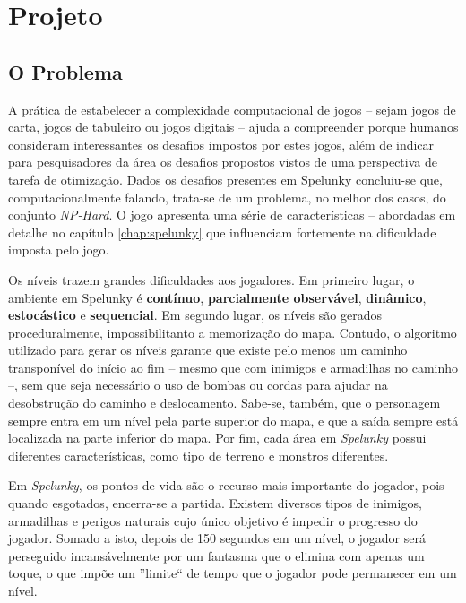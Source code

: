 \chapter{\label{chap:project}Projeto}


\section{\label{section:problem}O Problema}
A prática de estabelecer a complexidade computacional de jogos -- sejam jogos de
carta, jogos de tabuleiro ou jogos digitais -- ajuda a compreender  porque
humanos consideram interessantes os desafios impostos por estes jogos, além de
indicar para pesquisadores da área os desafios propostos vistos de uma
perspectiva de tarefa de otimização.  Dados os desafios presentes em Spelunky
concluiu-se que, computacionalmente falando, trata-se de um problema, no melhor
dos casos, do conjunto \textit{NP-Hard}\cite{SPELUNKYHARD}. O jogo apresenta uma
série de características -- abordadas em detalhe no capítulo \ref{chap:spelunky}
que influenciam fortemente na dificuldade imposta pelo jogo.

Os níveis trazem grandes dificuldades aos jogadores. Em primeiro lugar, o
ambiente em Spelunky é \textbf{contínuo}, \textbf{parcialmente observável},
\textbf{dinâmico}, \textbf{estocástico} e \textbf{sequencial}. Em segundo
lugar, os níveis são gerados proceduralmente, impossibilitanto a memorização do
mapa.  Contudo, o algoritmo utilizado para gerar os níveis garante que existe
pelo menos um caminho transponível do início ao fim -- mesmo que com inimigos e
armadilhas no caminho --, sem que seja necessário o uso de bombas ou cordas
para ajudar na desobstrução do caminho e deslocamento. Sabe-se, também, que o
personagem sempre entra em um nível pela parte superior do mapa, e que a saída
sempre está localizada na parte inferior do mapa. Por fim, cada área em
\textit{Spelunky} possui diferentes características, como tipo de terreno e
monstros diferentes.

Em \textit{Spelunky}, os pontos de vida são o recurso mais importante do
jogador, pois quando esgotados, encerra-se a partida. Existem diversos tipos de
inimigos, armadilhas e perigos naturais cujo único objetivo é impedir o
progresso do jogador.  Somado a isto, depois de 150 segundos em um nível, o
jogador será perseguido incansávelmente por um fantasma que o elimina com apenas
um toque, o que impõe um ''limite`` de tempo que o jogador pode permanecer em um
nível.

